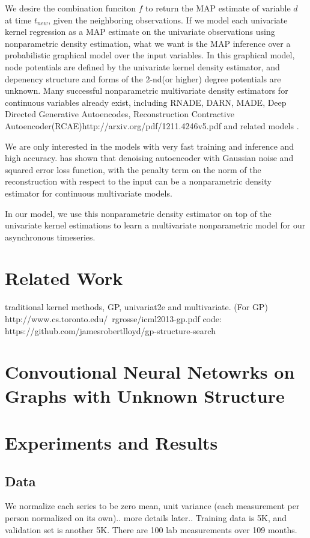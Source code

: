 \documentclass{article} %
\begin{document}
We desire the combination funciton $f$ to return the MAP estimate of variable $d$ at time $t_{new}$, given the neighboring observations. If we model each univariate kernel regression as a MAP estimate on the univariate observations using nonparametric density estimation, what we want is the MAP inference over a probabilistic graphical model over the input variables. In this graphical model, node potentials are defined by the univariate kernel density estimator, and depenency structure and forms of the 2-nd(or higher) degree potentials are unknown. 
Many successful nonparametric multivariate density estimators for continuous variables already exist, including RNADE\cite{}, DARN\cite{}, MADE\cite{}, Deep Directed Generative Autoencodes\cite{}, Reconstruction Contractive Autoencoder(RCAE)\cite{}http://arxiv.org/pdf/1211.4246v5.pdf and related models \cite{}\cite{}\cite{}.

We are only interested in the models with very fast training and inference and high accuracy. \cite{} has shown that denoising autoencoder with Gaussian noise and squared error loss function, with the penalty term on the norm of the reconstruction with respect to the input can be a nonparametric density estimator for continuous multivariate models. 

In our model, we use this nonparametric density estimator on top of the univariate kernel estimations to learn a multivariate nonparametric model for our asynchronous timeseries. 

\section{Related Work}
traditional kernel methods, GP, univariat2e and multivariate.
(For GP)
http://www.cs.toronto.edu/~rgrosse/icml2013-gp.pdf
code: https://github.com/jamesrobertlloyd/gp-structure-search

\section{Convoutional Neural Netowrks on Graphs with Unknown Structure}

\section{Experiments and Results}
\subsection{Data}
We normalize each series to be zero mean, unit variance (each measurement per person normalized on its own).. more details later..
Training data is 5K, and validation set is another 5K. There are 100 lab measurements over 109 months. 
\end{document}
